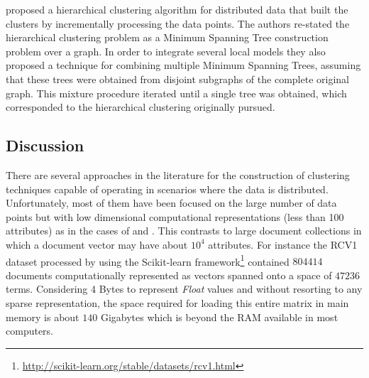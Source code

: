\documentclass[10pt]{article}
\begin{document}
\citep{JCHAC15} proposed a hierarchical clustering algorithm for distributed data that built the clusters by incrementally processing the data points. The authors re-stated the hierarchical clustering problem as a Minimum Spanning Tree construction problem over a graph. In order to integrate several local models they also proposed a technique for combining multiple Minimum Spanning Trees, assuming that these trees were obtained from disjoint subgraphs of the complete original graph. 
This mixture procedure iterated until a single tree was obtained, which corresponded to the hierarchical clustering originally pursued.

\subsection{Discussion}
There are several approaches in the literature for the construction of clustering techniques capable of operating in scenarios where the data is distributed. Unfortunately, most of them have been focused on the large number of data points but with low dimensional computational representations (less than 100 attributes) as in the cases of \citep{KLM03} and \citep{JKP04}. This contrasts to large document collections in which a document vector may have about $10^4$ attributes. For instance the RCV1 dataset processed by using the Scikit-learn framework\footnote{\url{http://scikit-learn.org/stable/datasets/rcv1.html}} contained $804414$ documents computationally represented as vectors spanned onto a space of $47236$ terms. Considering 4 Bytes to represent \textit{Float} values and without resorting to any sparse representation, the space required for loading this entire matrix in main memory is about $140$ Gigabytes which is beyond the RAM available in most computers.
\end{document}
